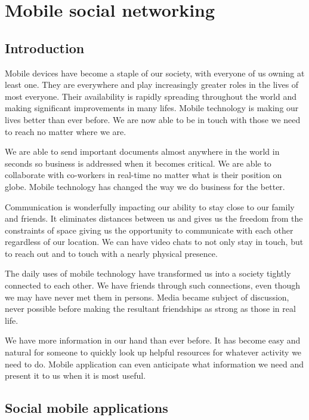 \chapter{Mobile social networking}\label{chap1}


\section{Introduction}

Mobile devices have become a staple of our society, with everyone of
us owning at least one. They are everywhere and play increasingly greater roles
in the lives of most everyone. Their availability is rapidly spreading
throughout the world and making significant improvements in many lifes. Mobile
technology is making our lives better than ever before. We are now able to be in
touch with those we need to reach no matter where we are.

We are able to send important documents almost anywhere in the world in seconds
so business is addressed when it becomes critical. We are able to collaborate
with co-workers in real-time no matter what is their position on globe. Mobile
technology has changed the way we do business for the better.

Communication is wonderfully impacting our ability to stay close to our family
and friends. It eliminates distances between us and gives us the freedom from
the constraints of space giving us the opportunity to communicate with each
other regardless of our location. We can have video chats to not only stay in
touch, but to reach out and to touch with a nearly physical presence.

The daily uses of mobile technology have transformed us into a society tightly
connected to each other. We have friends through such connections, even though
we may have never met them in persons. Media became subject of discussion, never
possible before making the resultant friendships as strong as those in real
life.

We have more information in our hand than ever before. It has become easy and
natural for someone to quickly look up helpful resources for whatever activity
we need to do. Mobile application can even anticipate what information we need
and present it to us when it is most useful.


\section{Social mobile applications}


